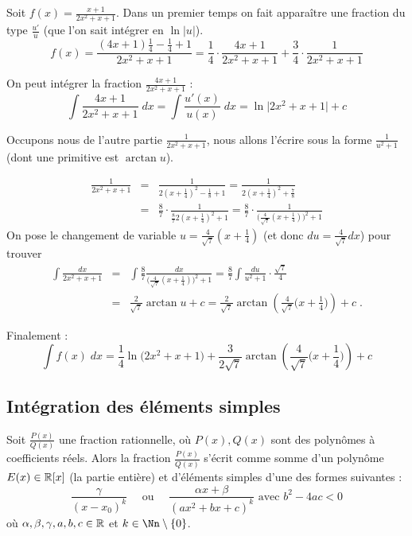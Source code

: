 \documentclass[class=report,crop=false]{standalone}
\begin{document}
\begin{exemple}
Soit $f(x)=\frac{x+1}{2x^2+x+1}$.
Dans un premier temps on fait apparaître une fraction du type $\frac{u'}{u}$
(que l'on sait intégrer en $\ln|u|$).
$$f(x) = \frac{(4x+1)\frac14-\frac14+1}{2x^2+x+1} = \frac14 \cdot \frac{4x+1}{2x^2+x+1} + \frac34 \cdot \frac{1}{2x^2+x+1}$$

On peut intégrer la fraction $\frac{4x+1}{2x^2+x+1}$ :
$$\int \frac{4x+1}{2x^2+x+1} \; dx = \int \frac{u'(x)}{u(x)} \; dx = \ln \big| 2x^2+x+1 \big|+c$$

\bigskip

Occupons nous de l'autre partie $\frac{1}{2x^2+x+1}$, nous allons l'écrire sous la forme
$\frac{1}{u^2+1}$ (dont une primitive est $\arctan u$).

\begin{eqnarray*}
\frac{1}{2x^2+x+1} 
&=&  \frac{1}{2(x+\frac 14)^2-\frac18+1}
=\frac{1}{2(x+\frac 14)^2+\frac78}\\
&=&\frac87 \cdot \frac{1}{\frac87 2(x+\frac 14)^2+1}
= \frac87 \cdot \frac{1}{\big(\frac{4}{\sqrt7}(x+\frac 14)\big)^2+1}
\end{eqnarray*}
On pose le changement de variable $u= \frac{4}{\sqrt7}(x+\frac 14)$
(et donc $du = \frac{4}{\sqrt7} dx$) pour trouver
\begin{eqnarray*}
\int \frac{dx}{2x^2+x+1}
&=& \int \frac87 \frac{dx}{\big(\frac{4}{\sqrt7}(x+\frac 14)\big)^2+1}
= \frac 87 \int \frac{du}{u^2+1} \cdot \frac{\sqrt7}{4} \\
&=& \frac{2}{\sqrt7}\arctan u+ c
= \frac{2}{\sqrt7}\arctan \left(\frac{4}{\sqrt7}\big(x+\frac 14\big)\right) + c \; .
\end{eqnarray*}

\bigskip

Finalement :
$$\int f(x)\; dx = \frac14\ln \big(2x^2+x+1\big) + \frac{3}{2\sqrt7}\arctan \left(\frac{4}{\sqrt7}\big(x+\frac 14\big)\right)+c$$
\end{exemple}


\subsection{Intégration des éléments simples}

Soit $\frac{P(x)}{Q(x)}$ une fraction rationnelle, où $P(x),Q(x)$ sont des polynômes à coefficients réels.
Alors la fraction $\frac{P(x)}{Q(x)}$ s'écrit comme somme d'un polynôme $E(x) \in \mathbb{R}[x]$ (la partie entière)
et d'éléments simples d'une des formes suivantes :
$$\frac{\gamma}{(x - x_0)^k} \quad \text{ ou } \quad \frac{\alpha x+\beta}{(a x^2+b x+c)^k} \text{ avec } b^2-4ac < 0$$
où $\alpha,\beta,\gamma,a,b,c \in \mathbb{R}$ et $k \in \Nn\setminus\{0\}$.
\end{document}
